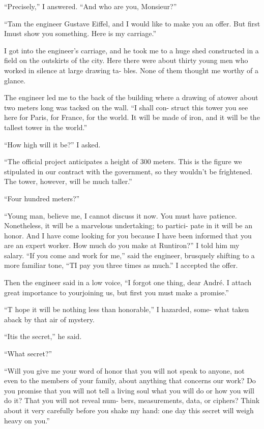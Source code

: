 \documentclass[12pt]{article}
\begin{document}
“Precisely,” I answered. “And who are you, Monsieur?”

“Tam the engineer Gustave Eiffel, and I would like to make you
an offer. But first Imust show you something. Here is my carriage.”

I got into the engineer’s carriage, and he took me to a huge shed
constructed in a field on the outskirts of the city. Here there were
about thirty young men who worked in silence at large drawing ta-
bles. None of them thought me worthy of a glance.

The engineer led me to the back of the building where a drawing
of atower about two meters long was tacked on the wall. “I shall con-
struct this tower you see here for Paris, for France, for the world. It
will be made of iron, and it will be the tallest tower in the world.”

“How high will it be?” I asked.

“The official project anticipates a height of 300 meters. This is the
figure we stipulated in our contract with the government, so they
wouldn’t be frightened. The tower, however, will be much taller.”

“Four hundred meters?”

“Young man, believe me, I cannot discuss it now. You must have
patience. Nonetheless, it will be a marvelous undertaking; to partici-
pate in it will be an honor. And I have come looking for you because I
have been informed that you are an expert worker. How much do you
make at Runtiron?” I told him my salary. “If you come and work for
me,” said the engineer, brusquely shifting to a more familiar tone,
“TI pay you three times as much.” I accepted the offer.

Then the engineer said in a low voice, “I forgot one thing, dear
André. I attach great importance to yourjoining us, but first you must
make a promise.”

“T hope it will be nothing less than honorable,” I hazarded, some-
what taken aback by that air of mystery.

“Itis the secret,” he said.

“What secret?”

“Will you give me your word of honor that you will not speak to
anyone, not even to the members of your family, about anything that
concerns our work? Do you promise that you will not tell a living soul
what you will do or how you will do it? That you will not reveal num-
bers, measurements, data, or ciphers? Think about it very carefully
before you shake my hand: one day this secret will weigh heavy on
you.”
\end{document}
